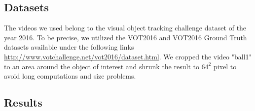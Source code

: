 \documentclass{article}
\begin{document}
\subsection{Datasets}
The videos we used belong to the visual object tracking challenge dataset of the year 2016. To be precise, we utilized the VOT2016 and VOT2016 Ground Truth datasets available under the following links \hyperlink{http://www.votchallenge.net/vot2016/dataset.html}{http://www.votchallenge.net/vot2016/dataset.html}. We cropped the video "ball1" to an area around the object of interest and shrunk the result to $64^2$ pixel to avoid long computations and size problems.
\subsection{Results}\label{results_section}
\end{document}
